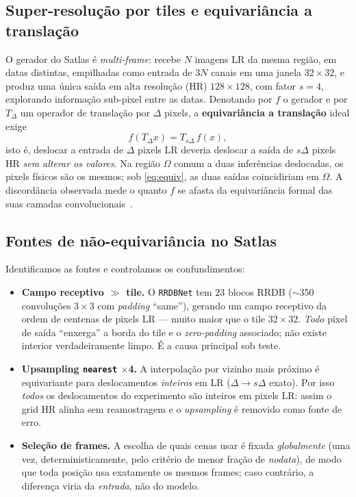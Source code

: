 \documentclass[conference]{IEEEtran}
\begin{document}
\subsection{Super-resolução por tiles e equivariância a translação}
O gerador do Satlas é \emph{multi-frame}: recebe $N$ imagens LR da mesma região, em
datas distintas, empilhadas como entrada de $3N$ canais em uma janela $32\times32$, e
produz uma única saída em alta resolução (HR) $128\times128$, com fator $s=4$,
explorando informação sub-pixel entre as datas. Denotando por $f$ o gerador e por
$T_\Delta$ um operador de translação por $\Delta$ pixels, a \textbf{equivariância a
translação} ideal exige
\begin{equation}
f(T_\Delta x) = T_{s\Delta}\, f(x),
\label{eq:equiv}
\end{equation}
isto é, deslocar a entrada de $\Delta$ pixels LR deveria deslocar a saída de $s\Delta$
pixels HR \emph{sem alterar os valores}. Na região $\Omega$ comum a duas inferências
deslocadas, os pixels físicos são os mesmos; sob \eqref{eq:equiv}, as duas saídas
coincidiriam em $\Omega$. A discordância observada mede o quanto $f$ se afasta da
equivariância formal das suas camadas convolucionais~\cite{b_shiftinv}.

\subsection{Fontes de não-equivariância no Satlas}
Identificamos as fontes e controlamos os confundimentos:
\begin{itemize}
  \item \textbf{Campo receptivo $\gg$ tile.} O \texttt{RRDBNet} tem $23$ blocos RRDB
  ($\sim$350 convoluções $3\times3$ com \textit{padding} ``same''), gerando um campo
  receptivo da ordem de centenas de pixels LR --- muito maior que o tile $32\times32$.
  \emph{Todo} pixel de saída ``enxerga'' a borda do tile e o \textit{zero-padding}
  associado; não existe interior verdadeiramente limpo. É a causa principal sob teste.
  \item \textbf{Upsampling \texttt{nearest} $\times$4.} A interpolação por vizinho mais
  próximo é equivariante para deslocamentos \emph{inteiros} em LR ($\Delta \to s\Delta$
  exato). Por isso \emph{todos} os deslocamentos do experimento são inteiros em pixels
  LR: assim o grid HR alinha sem reamostragem e o \textit{upsampling} é removido como
  fonte de erro.
  \item \textbf{Seleção de frames.} A escolha de quais cenas usar é fixada
  \emph{globalmente} (uma vez, deterministicamente, pelo critério de menor fração de
  \textit{nodata}), de modo que toda posição usa exatamente os mesmos frames; caso
  contrário, a diferença viria da \emph{entrada}, não do modelo.
\end{itemize}
\end{document}
